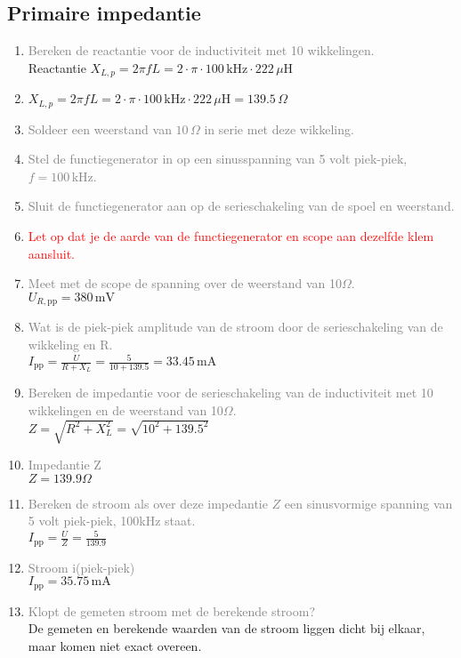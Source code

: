 \subsection{Primaire impedantie}
\begin{enumerate}
    \item \textcolor{gray}{Bereken de reactantie voor de inductiviteit met 10 wikkelingen.}
    \\ Reactantie \( X_{L,p} = 2 \pi f L = 2 \cdot \pi \cdot 100 \, \text{kHz} \cdot 222 \, \mu \text{H} \)
    \item\( X_{L,p} = 2 \pi f L = 2 \cdot \pi \cdot 100 \, \text{kHz} \cdot 222 \, \mu \text{H} = 139.5 \, \Omega \)
    \item \textcolor{gray}{Soldeer een weerstand van \(10 \, \Omega\) in serie met deze wikkeling.}
    \item \textcolor{gray}{Stel de functiegenerator in op een sinusspanning van 5 volt piek-piek, \( f = 100 \, \text{kHz} \).}
    \item \textcolor{gray}{Sluit de functiegenerator aan op de serieschakeling van de spoel en weerstand.}
    \item \textcolor{red}{Let op dat je de aarde van de functiegenerator en scope aan dezelfde klem aansluit.}
    \item \textcolor{gray}{Meet met de scope de spanning over de weerstand van 10\(\Omega\).}
    \\ \( U_{R,\text{pp}} = 380 \, \text{mV} \)
    \item \textcolor{gray}{Wat is de piek-piek amplitude van de stroom door de serieschakeling van de wikkeling en R.}
    \\ \(I_{\text{pp}} = \frac{U}{R + X_{L}} = \frac{5}{10 + 139.5} = 33.45 \, \text{mA}\)
    \item \textcolor{gray}{Bereken de impedantie voor de serieschakeling van de inductiviteit met 10 wikkelingen en de weerstand van 10\(\Omega\).}
    \\ \(Z = \sqrt{R^2 + X_{L}^2} = \sqrt{10^2 + 139.5^2}\)
    \item \textcolor{gray}{Impedantie Z}
    \\ \(Z = 139.9 \Omega\) 
    \item \textcolor{gray}{Bereken de stroom als over deze impedantie \(Z \) een sinusvormige spanning van 5 volt piek-piek, 100kHz staat.}
    \\ \(I_{\text{pp}} = \frac{U}{Z} = \frac{5}{139.9}\)
    \item \textcolor{gray}{Stroom i(piek-piek)}
    \\ \(I_{\text{pp}} = 35.75 \, \text{mA}\)
    \item \textcolor{gray}{Klopt de gemeten stroom met de berekende stroom?}
    \\ De gemeten en berekende waarden van de stroom liggen dicht bij elkaar, maar komen niet exact overeen.
\end{enumerate}